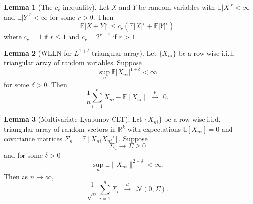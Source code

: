 \documentclass[11pt]{article}
\theoremstyle{definition}
\newtheorem{lemma}{Lemma}[section]
\newcommand{\R}{\ensuremath{\mathbb{R}}}
\newcommand{\Exp}{\ensuremath{\mathbb{E}}} %
\newcommand{\0}{\ensuremath{\mathbf{0}}}
\newcommand{\normal}{\ensuremath{\mathcal{N}}}
\begin{document}
\begin{bibunit}
\begin{lemma}[The $c_r$ inequality]
\label{lem:cr_ineq}
	Let $X$ and $Y$ be random variables with $\Exp|X|^r < \infty$ and $\Exp|Y|^r < \infty$ for some $r > 0$. Then 
	\[
		\Exp|X+Y|^r \leq c_r\left(\Exp|X|^r + \Exp|Y|^r\right)	
	\]  
	where $c_r = 1$ if $r \leq 1$ and $c_r = 2^{r-1}$ if $r > 1$.
\end{lemma}

\begin{lemma}[WLLN for $L^{1+\delta}$ triangular array]
\label{lem:wlln_array}
Let $\{X_{ni}\}$ be a row-wise i.i.d. triangular array of random variables. Suppose
\begin{equation}
\label{eq:wlln}
	\sup_{n}\Exp |X_{ni}|^{1+\delta} < \infty
\end{equation}
for some $\delta > 0$. 
Then 
\[
	\frac{1}{n}\sum_{i=1}^n X_{ni} - \Exp[X_{ni}] ~~\xrightarrow{p}~~ 0.
\]
\end{lemma}


\begin{lemma}[Multivariate Lyapunov CLT]
\label{lem:clt_array}
	Let $\{X_{ni}\}$ be a row-wise i.i.d. triangular array of random vectors in $\R^k$ with expectations $\Exp[X_{ni}] = 0$ and covariance matrices $\Sigma_{n} = \Exp[X_{ni}X_{ni}']$.  Suppose 
\begin{equation}
\label{eq:lyapunov_var}
	\Sigma_n \to \Sigma \geq 0
\end{equation}
and for some $\delta > 0$
\begin{equation}
\label{eq:lyapunov_moment}
	\sup_{n} \Exp\|X_{ni}\|^{2+\delta} < \infty.
\end{equation}
Then as $n\to \infty$,
\[
	\frac{1}{\sqrt{n}}\sum_{i=1}^n X_i ~~\xrightarrow{d}~~ \normal(0,\Sigma).
\]
\end{lemma}

\putbib
\end{bibunit}

%
\end{document}
